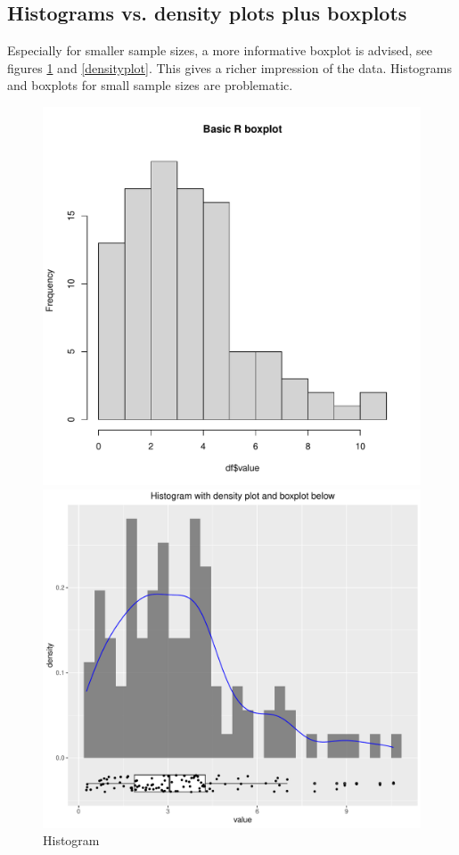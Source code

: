 \documentclass[12pt,a4paper]{article}
\begin{document}
\subsection{Histograms vs. density plots plus boxplots}
Especially for smaller sample sizes, a more informative boxplot is advised, see figures \ref{histogram} and \ref{densityplot}. This gives a richer impression of the data. Histograms and boxplots for small sample sizes are problematic.

\begin{figure}[htbp]
  \centering
  \begin{minipage}[b]{0.45\textwidth}
    \includegraphics[width=\textwidth]{./images/histogram.pdf}
    \caption{Histogram}
    \label{histogram}
  \end{minipage}
  \hfill  %
  \begin{minipage}[b]{0.45\textwidth}
    \includegraphics[width=\textwidth]{./images/density_plot_with_boxplot.pdf}

\end{minipage}
\end{figure}
\end{document}

